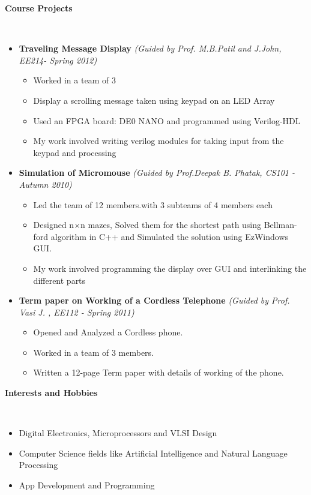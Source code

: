 \documentclass[a4paper,11pt]{article}
\newcommand{\isep}{-2 pt}
\newcommand{\lsep}{-0.5cm}
\newcommand{\resheading}[1]{{\small \colorbox{mygrey}{\begin{minipage}{0.975\textwidth}{\textbf{#1 \vphantom{p\^{E}}}}\end{minipage}}}}
\begin{document}
\resheading{\textbf{\large Course Projects}}\\[\lsep]
\begin{itemize}
\item \textbf{Traveling Message Display} \emph{(Guided by Prof. M.B.Patil and J.John, EE214- Spring 2012)}\\[-0.6cm]
    \begin{itemize}\itemsep \isep
        \item Worked in a team of 3 
        \item Display a scrolling message taken using keypad on an LED Array
        \item Used an FPGA board: DE0 NANO and programmed using Verilog-HDL
        \item My work involved writing verilog modules for taking input from the keypad and processing
    \end{itemize}
    	\item \textbf{Simulation of Micromouse} \emph{(Guided by Prof.Deepak B. Phatak, CS101 - Autumn 2010)}\\[-0.6cm]
	\begin{itemize}\itemsep \isep 
	    \item Led the team of 12 members.with 3 subteams of 4 members each
	    \item Designed n$\times$n mazes, Solved them for the shortest path using Bellman-ford algorithm in C++ and Simulated the solution using EzWindows GUI.
	    \item My work involved programming the display over GUI and interlinking the different parts
	\end{itemize} 
\item \textbf{Term paper on Working of a Cordless Telephone} \emph{(Guided by Prof. Vasi J. , EE112 - Spring 2011)\\[-0.6cm]}
	\begin{itemize} \itemsep \isep
	  \item Opened and Analyzed a Cordless phone.
	  \item Worked in a team of 3 members.
	  \item Written a 12-page Term paper with details of working of the phone.
	\end{itemize}
\end{itemize}

\resheading{\textbf{\large Interests and Hobbies}} \\[\lsep] 
\begin{itemize} \itemsep \isep
    \item Digital Electronics, Microprocessors and VLSI Design
    \item Computer Science fields like Artificial Intelligence and Natural Language Processing
    \item App Development and Programming
\end{itemize}
\end{document}
